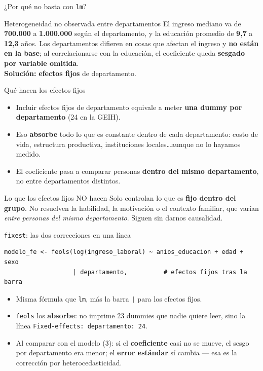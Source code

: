 \documentclass[10pt]{beamer}
\begin{document}
\begin{frame}{¿Por qué no basta con \texttt{lm}?}
  \begin{block}{Heterogeneidad no observada entre departamentos}
    El ingreso mediano va de \textbf{700.000} a \textbf{1.000.000} según el departamento, y la educación promedio de \textbf{9,7} a \textbf{12,3} años. Los departamentos difieren en cosas que afectan el ingreso y \textbf{no están en la base}; al correlacionarse con la educación, el coeficiente queda \textbf{sesgado por variable omitida}.\\[0.5em]
    \textbf{Solución:} \textbf{efectos fijos} de departamento.
  \end{block}
\end{frame}

\begin{frame}{Qué hacen los efectos fijos}
  \begin{itemize}\setlength\itemsep{0.7em}
    \item Incluir efectos fijos de departamento equivale a meter \textbf{una dummy por departamento} (24 en la GEIH).
    \item Eso \textbf{absorbe} todo lo que es constante dentro de cada departamento: costo de vida, estructura productiva, instituciones locales\ldots aunque no lo hayamos medido.
    \item El coeficiente pasa a comparar personas \textbf{dentro del mismo departamento}, no entre departamentos distintos.
  \end{itemize}
  \bigskip
  \begin{alertblock}{Lo que los efectos fijos NO hacen}
    Solo controlan lo que es \textbf{fijo dentro del grupo}. No resuelven la habilidad, la motivación o el contexto familiar, que varían \emph{entre personas del mismo departamento}. Siguen sin darnos causalidad.
  \end{alertblock}
\end{frame}

\begin{frame}[fragile]{\texttt{fixest}: las dos correcciones en una línea}
\begin{lstlisting}
modelo_fe <- feols(log(ingreso_laboral) ~ anios_educacion + edad + sexo
                   | departamento,          # efectos fijos tras la barra
\end{lstlisting}
  \begin{itemize}
    \item Misma fórmula que \texttt{lm}, más la barra \texttt{|} para los efectos fijos.
    \item \texttt{feols} los \textbf{absorbe}: no imprime 23 dummies que nadie quiere leer, sino la línea \texttt{Fixed-effects: departamento: 24}.
    \item Al comparar con el modelo (3): si el \textbf{coeficiente} casi no se mueve, el sesgo por departamento era menor; el \textbf{error estándar} sí cambia --- esa es la corrección por heterocedasticidad.
  \end{itemize}
\end{frame}
\end{document}
